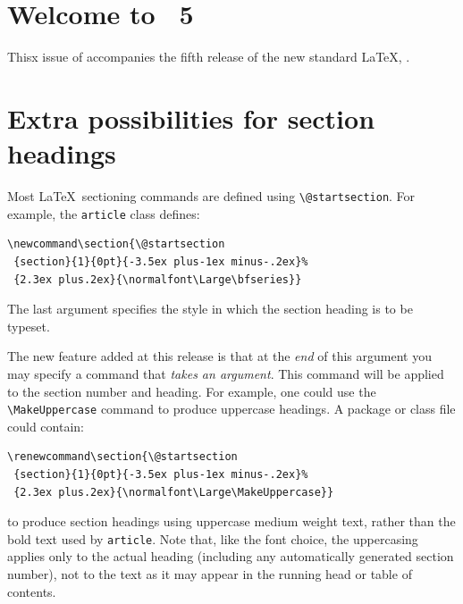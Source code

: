 \documentclass{ltnews}
\providecommand\cls[1]{\texttt{#1}}
\begin{document}
\maketitle

\section{Welcome to \LaTeXNews~5}
Thisx issue of \emph{\LaTeXNews} accompanies the fifth release of the
new standard \LaTeX{}, \LaTeXe.

\section{Extra possibilities for section headings}
Most \LaTeX\ sectioning commands are defined using
\verb|\@startsection|.
For example, the \cls{article} class defines:
\begin{small}
\begin{verbatim}
\newcommand\section{\@startsection
 {section}{1}{0pt}{-3.5ex plus-1ex minus-.2ex}%
 {2.3ex plus.2ex}{\normalfont\Large\bfseries}}
\end{verbatim}
\end{small}
The last argument specifies the style in which the section heading is
to be typeset.

The new feature added at this release is that at the \emph{end} of
this argument you may specify a command that \emph{takes an argument}.
This command will be applied to the section number and heading.
For example, one could use the \verb|\MakeUppercase| command to
produce uppercase headings. A package or class file could contain:
\begin{small}
\begin{verbatim}
\renewcommand\section{\@startsection
 {section}{1}{0pt}{-3.5ex plus-1ex minus-.2ex}%
 {2.3ex plus.2ex}{\normalfont\Large\MakeUppercase}}
\end{verbatim}
\end{small}
to produce section headings using uppercase medium weight text, rather
than the bold text used by \cls{article}. Note that, like the font
choice, the uppercasing applies only to the actual heading (including
any automatically generated section number), not to the text as it may
appear in the running head or table of contents.
\end{document}
